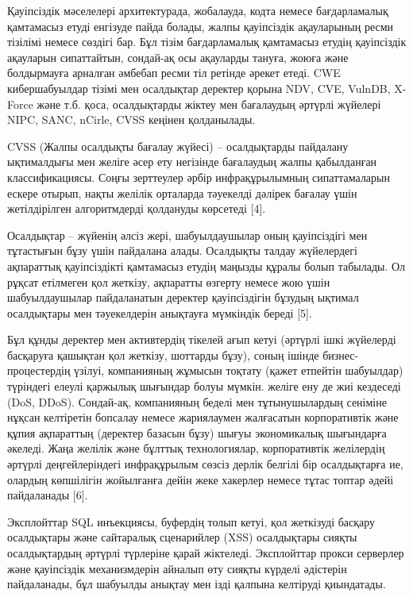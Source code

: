 Қауіпсіздік мәселелері архитектурада, жобалауда, кодта немесе
бағдарламалық қамтамасыз етуді енгізуде пайда болады, жалпы қауіпсіздік
ақауларының ресми тізілімі немесе сөздігі бар. Бұл тізім бағдарламалық
қамтамасыз етудің қауіпсіздік ақауларын сипаттайтын, сондай-ақ осы
ақауларды тануға, жоюға және болдырмауға арналған әмбебап ресми тіл
ретінде әрекет етеді. CWE кибершабуылдар тізімі мен осалдықтар деректер
қорына NDV, CVE, VulnDB, X-Force және т.б. қоса, осалдықтарды жіктеу мен
бағалаудың әртүрлі жүйелері NIPC, SANC, nCirle, CVSS кеңінен
қолданылады.

CVSS (Жалпы осалдықты бағалау жүйесі) -- осалдықтарды пайдалану
ықтималдығы мен желіге әсер ету негізінде бағалаудың жалпы қабылданған
классификациясы. Соңғы зерттеулер әрбір инфрақұрылымның сипаттамаларын
ескере отырып, нақты желілік орталарда тәуекелді дәлірек бағалау үшін
жетілдірілген алгоритмдерді қолдануды көрсетеді {[}4{]}.

Осалдықтар -- жүйенің әлсіз жері, шабуылдаушылар оның қауіпсіздігі мен
тұтастығын бұзу үшін пайдалана алады. Осалдықты талдау жүйелердегі
ақпараттық қауіпсіздікті қамтамасыз етудің маңызды құралы болып
табылады. Ол рұқсат етілмеген қол жеткізу, ақпаратты өзгерту немесе жою
үшін шабуылдаушылар пайдаланатын деректер қауіпсіздігін бұзудың ықтимал
осалдықтары мен тәуекелдерін анықтауға мүмкіндік береді {[}5{]}.

Бұл құнды деректер мен активтердің тікелей ағып кетуі (әртүрлі ішкі
жүйелерді басқаруға қашықтан қол жеткізу, шоттарды бұзу), соның ішінде
бизнес-процестердің үзілуі, компанияның жұмысын тоқтату (қажет етпейтін
шабуылдар) түріндегі елеулі қаржылық шығындар болуы мүмкін. желіге ену
де жиі кездеседі (DoS, DDoS). Сондай-ақ, компанияның беделі мен
тұтынушылардың сеніміне нұқсан келтіретін бопсалау немесе жариялаумен
жалғасатын корпоративтік және құпия ақпараттың (деректер базасын бұзу)
шығуы экономикалық шығындарға әкеледі. Жаңа желілік және бұлттық
технологиялар, корпоративтік желілердің әртүрлі деңгейлеріндегі
инфрақұрылым сөзсіз дерлік белгілі бір осалдықтарға ие, олардың
көпшілігін жойылғанға дейін жеке хакерлер немесе тұтас топтар әдейі
пайдаланады {[}6{]}.

Эксплойттар SQL инъекциясы, буфердің толып кетуі, қол жеткізуді басқару
осалдықтары және сайтаралық сценарийлер (XSS) осалдықтары сияқты
осалдықтардың әртүрлі түрлеріне қарай жіктеледі. Эксплойттар прокси
серверлер және қауіпсіздік механизмдерін айналып өту сияқты күрделі
әдістерін пайдаланады, бұл шабуылды анықтау мен ізді қалпына келтіруді
қиындатады.

